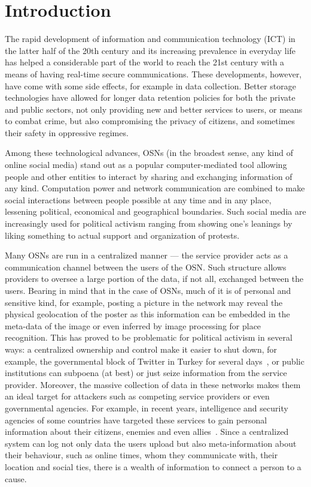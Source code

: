 \section{Introduction}
\label{Introduction}
The rapid development of information and communication technology (ICT) in the latter half of the
20th century and its increasing prevalence in
everyday life has helped a considerable part of the world to reach the
21st century with a means of having real-time secure
communications.  These developments, however,  have come
with some side effects, for example in data collection. Better storage
technologies have allowed for longer data retention policies for both
the private and public sectors, not only providing new and better
services to users, or means to combat crime, but also compromising the privacy of
citizens, and sometimes their safety in oppressive regimes.

Among these technological advances, \acp{OSN} (in the broadest sense,
any kind of online social media) stand out as a popular
computer-mediated tool allowing people and other entities to interact
by sharing and exchanging information of any kind. Computation power
and network communication are combined to make social interactions
between people possible at any time and in any place, lessening
political, economical and geographical boundaries. Such social media
are increasingly used for political activism ranging from showing
one's leanings by liking something to actual support and organization
of protests.

Many \acp{OSN} are run in a centralized manner --- the service
provider acts as a communication channel between the users of the
\ac{OSN}. Such structure allows providers to oversee a large portion
of the data, if not all, exchanged between the users. Bearing in mind
that in the case of \acp{OSN}, much of it is of personal and sensitive
kind, for example, posting a picture in the network may reveal the
physical geolocation of the poster as this information can be embedded
in the meta-data of the image or even inferred by image processing for
place recognition. This has proved to be problematic for political
activism in several ways: a centralized ownership and control make it
easier to shut down, for example, the governmental block of Twitter in
Turkey for several days~\cite{TurkeyBansTwitter}, or public
institutions can subpoena (at best) or just seize information from the
service provider. Moreover, the massive collection of data in these
networks makes them an ideal target for attackers such as competing
service providers or even governmental agencies. For example, in
recent years, intelligence and security agencies of some countries
have targeted these services to gain personal information about their
citizens, enemies and even allies~\cite{Prism}. Since a centralized
system can log not only data the users upload but also
meta-information about their behaviour, such as online times, whom
they communicate with, their location and social ties, there is a
wealth of information to connect a person to a cause.

